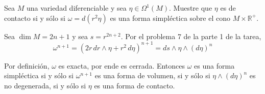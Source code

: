 \begin{problem}
Sea $M$ una variedad diferenciable y sea $\eta \in \Omega^1(M)$. Muestre que $\eta$ es de contacto si y sólo si $\omega = d(r^2 \eta)$ es una forma simpléctica sobre el cono $M \times \mathbb R^+$.
\end{problem}

\begin{solution}
Sea $\dim M = 2n+1$ y sea $s = r^{2n+2}$. Por el problema 7 de la parte 1 de la tarea,
$$\omega^{n+1} = (2r \, dr \wedge \eta + r^2 \, d\eta)^{n+1} = ds \wedge \eta \wedge (d\eta)^n$$

Por definición, $\omega$ es exacta, por ende es cerrada. Entonces $\omega$ es una forma simpléctica si y sólo si $\omega^{n+1}$ es una forma de volumen, si y sólo si $\eta \wedge (d\eta)^n$ es no degenerada, si y sólo si $\eta$ es una forma de contacto.
\end{solution}
